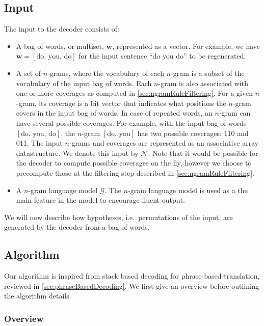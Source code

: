 \subsection{Input}

The input to the decoder consists of:
%
\begin{itemize}
  \item A bag of words, or multiset, $\bm{w}$, represented as a vector.
    For example, we have $\bm{w} = [\text{do, you, do}]$ for the
    input sentence ``do you do'' to be regenerated.
  \item A set of $n$-grams, where the
    vocabulary of each $n$-gram is a subset of the vocabulary of the
    input bag of words. Each $n$-gram is also associated with
    one or more coverages as computed in \autoref{sec:ngramRuleFiltering}.
    For a given $n$-gram, its coverage is a bit vector
    that indicates what positions the $n$-gram covers in the input bag of words.
    In case of repeated words, an $n$-gram can have several possible
    coverages. For example, with the input bag of words
    $[\text{do, you, do}]$, the $n$-gram $[\text{do, you}]$ has
    two possible coverages: 110 and 011.
    The input $n$-grams and coverages are represented as
    an associative array datastructure. We denote this
    input by $\mathcal{N}$. Note that it would be possible for the decoder
    to compute possible coverages on the fly, however we choose to precompute those
    at the filtering step described in \autoref{sec:ngramRuleFiltering}.
  \item A $n$-gram language model $\mathcal{G}$. The $n$-gram
    language model is used as a the main feature in the model to
    encourage fluent output.
\end{itemize}
%
We will now describe how hypotheses, i.e.\ permutations of the
input, are generated by the decoder from a bag of words.

\subsection{Algorithm}

Our algorithm is inspired from stack based decoding for phrase-based
translation, reviewed in \autoref{sec:phraseBasedDecoding}. We
first give an overview
before outlining the algorithm details.

\subsubsection{Overview}
\label{sec:gyroAlgorithmOverview}

